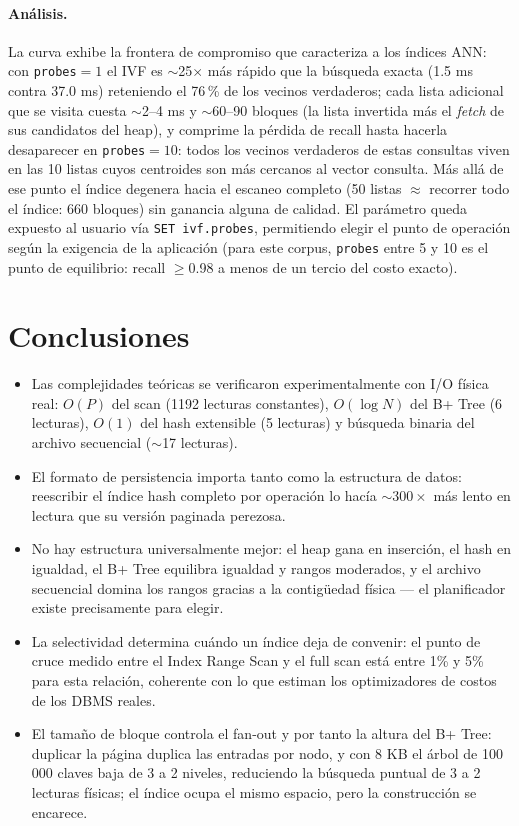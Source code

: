 \documentclass[11pt]{article}
\begin{document}
\paragraph{Análisis.}
La curva exhibe la frontera de compromiso que caracteriza a los índices
ANN: con \texttt{probes}${=1}$ el IVF es $\sim$25$\times$ más rápido que
la búsqueda exacta (1.5 ms contra 37.0 ms) reteniendo el 76\,\% de los
vecinos verdaderos; cada lista adicional que se visita cuesta
$\sim$2--4 ms y $\sim$60--90 bloques (la lista invertida más el
\emph{fetch} de sus candidatos del heap), y comprime la pérdida de
recall hasta hacerla desaparecer en \texttt{probes}${=10}$: todos los
vecinos verdaderos de estas consultas viven en las 10 listas cuyos
centroides son más cercanos al vector consulta. Más allá de ese punto el
índice degenera hacia el escaneo completo (50 listas $\approx$ recorrer
todo el índice: 660 bloques) sin ganancia alguna de calidad. El
parámetro queda expuesto al usuario vía \texttt{SET ivf.probes},
permitiendo elegir el punto de operación según la exigencia de la
aplicación (para este corpus, \texttt{probes} entre 5 y 10 es el punto
de equilibrio: recall $\ge$0.98 a menos de un tercio del costo exacto).

\section{Conclusiones}

\begin{itemize}
  \item Las complejidades teóricas se verificaron experimentalmente con I/O
        física real: $O(P)$ del scan (1192 lecturas constantes), $O(\log N)$
        del B+ Tree (6 lecturas), $O(1)$ del hash extensible (5 lecturas) y
        búsqueda binaria del archivo secuencial ($\sim$17 lecturas).
  \item El formato de persistencia importa tanto como la estructura de
        datos: reescribir el índice hash completo por operación lo hacía
        $\sim$$300\times$ más lento en lectura que su versión paginada perezosa.
  \item No hay estructura universalmente mejor: el heap gana en inserción,
        el hash en igualdad, el B+ Tree equilibra igualdad y rangos
        moderados, y el archivo secuencial domina los rangos gracias a la
        contigüedad física — el planificador existe precisamente para elegir.
  \item La selectividad determina cuándo un índice deja de convenir: el
        punto de cruce medido entre el Index Range Scan y el full scan está
        entre 1\% y 5\% para esta relación, coherente con lo que estiman los
        optimizadores de costos de los DBMS reales.
  \item El tamaño de bloque controla el fan-out y por tanto la altura del
        B+ Tree: duplicar la página duplica las entradas por nodo, y con 8 KB
        el árbol de 100\,000 claves baja de 3 a 2 niveles, reduciendo la
        búsqueda puntual de 3 a 2 lecturas físicas; el índice ocupa el mismo
        espacio, pero la construcción se encarece.
\end{itemize}
\end{document}
